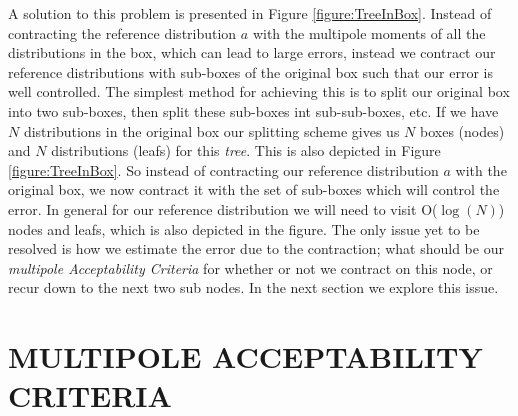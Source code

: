 \documentclass[prb,aps,nobibnotes,superbib,preprint]{revtex4}
\begin{document}
A solution to this problem is presented in Figure {\ref{figure:TreeInBox}}. 
Instead of contracting the reference distribution $a$ with the multipole moments of all the distributions in the
box, which can lead to large errors, instead we contract our reference distributions with sub-boxes of the original
box such that our error is well controlled. The simplest method for achieving this is to split our original box
into two sub-boxes, then split these sub-boxes int sub-sub-boxes, etc. If we have $N$ distributions in the original 
box our splitting scheme gives us $N$ boxes (nodes) and $N$ distributions (leafs) for this {\it tree}. This is also
depicted in  Figure {\ref{figure:TreeInBox}}. So instead of contracting our reference distribution $a$ with the 
original box, we now contract it with the set of sub-boxes which will control the error. In general for our reference
distribution we will need to visit {\cal O}($\log (N)$) nodes and leafs, which is also depicted in the figure. The 
only issue yet to be resolved is how we estimate the error due to the contraction; what should be our
{\it multipole Acceptability Criteria} for whether or not we contract on this node, or recur down to the next two 
sub nodes. In the next section we explore this issue.


\section{MULTIPOLE ACCEPTABILITY CRITERIA } 
\end{document}
